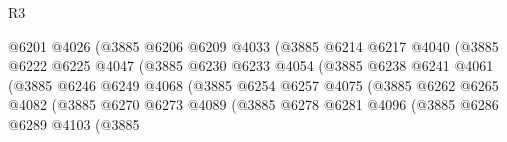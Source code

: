 \begin{lexlean}{R3}
\begin{coremodule}
                                      @6201
                                      @4026
                                      (@3885
                                        @6206
                                        @6209
                                        @4033
                                        (@3885
                                          @6214
                                          @6217
                                          @4040
                                          (@3885
                                            @6222
                                            @6225
                                            @4047
                                            (@3885
                                              @6230
                                              @6233
                                              @4054
                                              (@3885
                                                @6238
                                                @6241
                                                @4061
                                                (@3885
                                                  @6246
                                                  @6249
                                                  @4068
                                                  (@3885
                                                    @6254
                                                    @6257
                                                    @4075
                                                    (@3885
                                                      @6262
                                                      @6265
                                                      @4082
                                                      (@3885
                                                        @6270
                                                        @6273
                                                        @4089
                                                        (@3885
                                                          @6278
                                                          @6281
                                                          @4096
                                                          (@3885
                                                            @6286
                                                            @6289
                                                            @4103
                                                            (@3885

\end{coremodule}
\end{lexlean}
